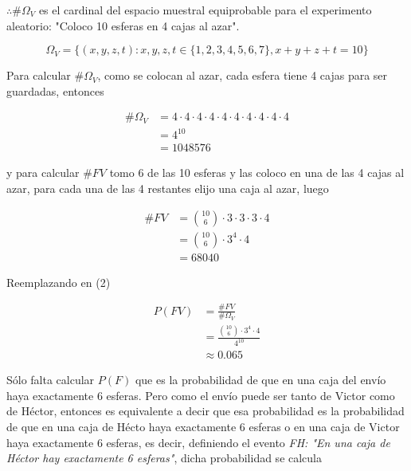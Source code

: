 \documentclass[hidelinks]{article}
\begin{document}
$\therefore \#\Omega_{V}$ es el cardinal del espacio muestral equiprobable para el experimento aleatorio: "Coloco 10 esferas en 4 cajas al azar".

\begin{equation*}
    \Omega_{V} = \{(x, y, z, t): x, y, z, t \in \{1, 2, 3, 4, 5, 6, 7\}, x + y + z + t = 10\}
\end{equation*}

Para calcular $\#\Omega_{V}$, como se colocan al azar, cada esfera tiene 4 cajas para ser guardadas, entonces

\begin{equation*}
    \begin{aligned}
        \#\Omega_{V} &= 4 \cdot 4 \cdot 4 \cdot 4 \cdot 4 \cdot 4 \cdot 4 \cdot 4 \cdot 4 \cdot 4\\
                     &= 4^{10}\\
                     &= 1048576
    \end{aligned}
\end{equation*}

y para calcular $\#FV$ tomo 6 de las 10 esferas y las coloco en una de las 4 cajas al azar, para cada una de las 4 restantes elijo una caja al azar, luego

\begin{equation*}
    \begin{aligned}
        \#FV &= \binom{10}{6} \cdot 3 \cdot 3 \cdot 3 \cdot 4\\
             &= \binom{10}{6} \cdot 3^{4} \cdot 4\\
             &= 68040
    \end{aligned}
\end{equation*}

Reemplazando en (2)

\begin{equation*}
    \begin{aligned}
        P(FV) &= \frac{\#FV}{\#\Omega_{V}}\\
              &= \frac{\binom{10}{6} \cdot 3^{4} \cdot 4}{4^{10}}\\
              &\approx 0.065
    \end{aligned}
\end{equation*}

Sólo falta calcular $P(F)$ que es la probabilidad de que en una caja del envío haya exactamente 6 esferas. Pero como el envío puede ser tanto de Victor como de Héctor, entonces es equivalente a decir que esa probabilidad es la probabilidad de que en una caja de Hécto haya exactamente 6 esferas o en una caja de Victor haya exactamente 6 esferas, es decir, definiendo el evento \textit{FH: "En una caja de Héctor hay exactamente 6 esferas"}, dicha probabilidad se calcula
\end{document}
